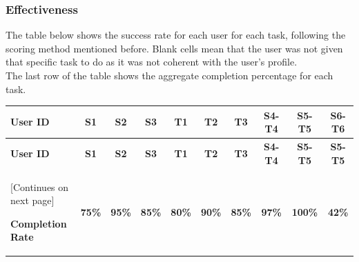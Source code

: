 \subsubsection{Effectiveness}
    The table below shows the success rate for each user for each task, following the scoring method mentioned before. Blank cells mean that the user was not given that specific task to do as it was not coherent with the user's profile.\\
    The last row of the table shows the aggregate completion percentage for each task.
    \begin{tabularx}{\linewidth}{l|c|c|c|c|c|c|c|c|c}
    \toprule
    \textbf{User ID} & \textbf{S1} & \textbf{S2} & \textbf{S3} & \textbf{T1} & \textbf{T2} & \textbf{T3} & \textbf{S4-T4} & \textbf{S5-T5} & \textbf{S6-T6} \\
    \midrule
    \endfirsthead
    \toprule
    \textbf{User ID} & \textbf{S1} & \textbf{S2} & \textbf{S3} & \textbf{T1} & \textbf{T2} & \textbf{T3} & \textbf{S4-T4} & \textbf{S5-T5} & \textbf{S5-T5} \\
    \hline
    \endhead
    \midrule
    \footnotesize [Continues on next page]
    \endfoot
    \bottomrule
    \endlastfoot

        \textbf{Completion Rate} & \textbf{75\%} & \textbf{95\%} & \textbf{85\%} & \textbf{80\%} & \textbf{90\%} & \textbf{85\%} & \textbf{97\%} & \textbf{100\%} & \textbf{42\%}
    \end{tabularx}

